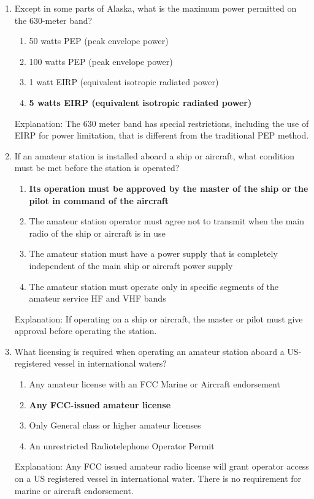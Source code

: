 \begin{enumerate}
      \item Except in some parts of Alaska, what is the maximum power permitted on the 630-meter band?
        \begin{enumerate}
       \item 50 watts PEP (peak envelope power)
      \item  100 watts PEP (peak envelope power)
       \item  1 watt EIRP (equivalent isotropic radiated power)
        \item \textbf {5 watts EIRP (equivalent isotropic radiated power)}
    \end{enumerate}
        \textcolor{myred}{Explanation:}
         The 630 meter band has special restrictions, including the use of EIRP for power limitation, that is different from the traditional PEP method.
         
      \item If an amateur station is installed aboard a ship or aircraft, what condition must be met before the station is operated?
        \begin{enumerate}
        \item \textbf {Its operation must be approved by the master of the ship or the pilot in command of the aircraft}
       \item  The amateur station operator must agree not to transmit when the main radio of the ship or aircraft is in use
       \item  The amateur station must have a power supply that is completely independent of the main ship or aircraft power supply
        \item  The amateur station must operate only in specific segments of the amateur service HF and VHF bands
     \end{enumerate}
        \textcolor{myred}{Explanation:}
    If operating on a ship or aircraft, the master or pilot must give approval before operating the station.
      
    \item What licensing is required when operating an amateur station aboard a US-registered vessel in international waters?
      \begin{enumerate}
     \item Any amateur license with an FCC Marine or Aircraft endorsement
    \item \textbf {Any FCC-issued amateur license}
       \item  Only General class or higher amateur licenses
     \item  An unrestricted Radiotelephone Operator Permit
      \end{enumerate}
     \textcolor{myred}{Explanation:}
      Any FCC issued amateur radio license will grant operator access on a US registered vessel in international water. There is no requirement for marine or aircraft endorsement.
\end{enumerate}


